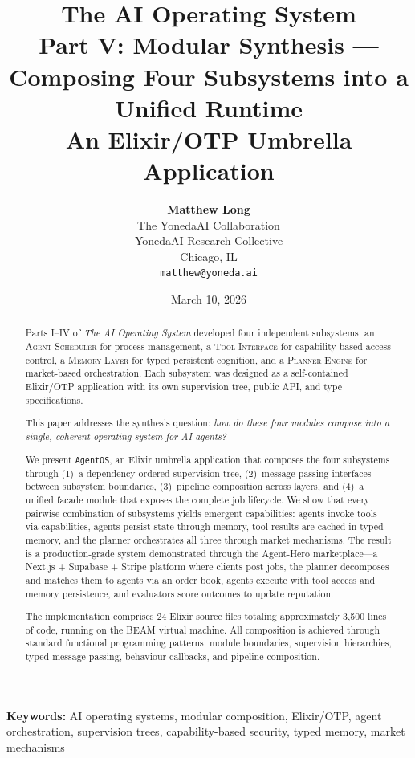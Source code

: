 \documentclass[12pt,a4paper]{article}
\title{%
  \textbf{The AI Operating System}\\[0.5em]
  \Large Part V: Modular Synthesis ---\\
  Composing Four Subsystems into a Unified Runtime\\[1em]
  \large An Elixir/OTP Umbrella Application
}
\author{%
  \textbf{Matthew Long}\\
  The YonedaAI Collaboration\\
  YonedaAI Research Collective\\
  Chicago, IL\\
  \texttt{matthew@yoneda.ai}
}
\date{March 10, 2026}
\theoremstyle{definition}
\begin{document}
\maketitle

\begin{abstract}
Parts I--IV of \textit{The AI Operating System} developed four independent subsystems: an
\textsc{Agent Scheduler} for process management, a \textsc{Tool Interface}
for capability-based access control, a \textsc{Memory Layer} for typed persistent
cognition, and a \textsc{Planner Engine} for market-based orchestration.
Each subsystem was designed as a self-contained Elixir/OTP application with its own
supervision tree, public API, and type specifications.

This paper addresses the synthesis question: \emph{how do these four modules compose
into a single, coherent operating system for AI agents?}

We present \texttt{AgentOS}, an Elixir umbrella application that composes the four
subsystems through (1)~a dependency-ordered supervision tree,
(2)~message-passing interfaces between subsystem boundaries,
(3)~pipeline composition across layers, and (4)~a unified facade module that
exposes the complete job lifecycle.
We show that every pairwise combination of subsystems yields emergent capabilities:
agents invoke tools via capabilities, agents persist state through memory,
tool results are cached in typed memory, and the planner orchestrates all three
through market mechanisms.
The result is a production-grade system demonstrated through the Agent-Hero
marketplace---a Next.js + Supabase + Stripe platform where clients post jobs,
the planner decomposes and matches them to agents via an order book, agents
execute with tool access and memory persistence, and evaluators score outcomes
to update reputation.

The implementation comprises 24 Elixir source files totaling approximately 3{,}500
lines of code, running on the BEAM virtual machine.
All composition is achieved through standard functional programming
patterns: module boundaries, supervision hierarchies, typed message passing,
behaviour callbacks, and pipeline composition.
\end{abstract}

\vspace{1em}
\noindent\textbf{Keywords:} AI operating systems, modular composition, Elixir/OTP, agent orchestration,
supervision trees, capability-based security, typed memory, market mechanisms
\end{document}
